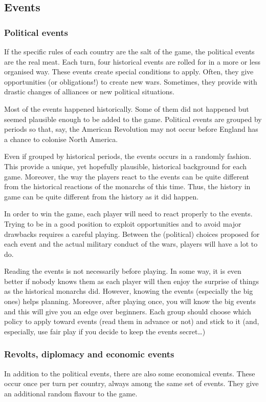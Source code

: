 \subsection*{Events}
\subsubsection*{Political events}
If the specific rules of each country are the salt of the game, the political
events are the real meat. Each turn, four historical events are rolled for in
a more or less organised way. These events create special conditions to
apply. Often, they give opportunities (or obligations!) to create new
wars. Sometimes, they provide with drastic changes of alliances or new
political situations.

Most of the events happened historically. Some of them did not happened but
seemed plausible enough to be added to the game. Political events are grouped
by periods so that, say, the American Revolution may not occur before England
has a chance to colonise North America.

Even if grouped by historical periods, the events occurs in a randomly
fashion. This provide a unique, yet hopefully plausible, historical background
for each game. Moreover, the way the players react to the events can be quite
different from the historical reactions of the monarchs of this time. Thus,
the history in game can be quite different from the history as it did happen.

In order to win the game, each player will need to react properly to the
events. Trying to be in a good position to exploit opportunities and to avoid
major drawbacks requires a careful playing. Between the (political) choices
proposed for each event and the actual military conduct of the wars, players
will have a lot to do.

Reading the events is not necessarily before playing. In some way, it is even
better if nobody knows them as each player will then enjoy the surprise of
things as the historical monarchs did. However, knowing the events (especially
the big ones) helps planning. Moreover, after playing once, you will know the
big events and this will give you an edge over beginners. Each group should
choose which policy to apply toward events (read them in advance or not) and
stick to it (and, especially, use fair play if you decide to keep the events
secret\ldots)

\subsubsection*{Revolts, diplomacy and economic events}
In addition to the political events, there are also some economical
events. These occur once per turn per country, always among the same set of
events. They give an additional random flavour to the game.

